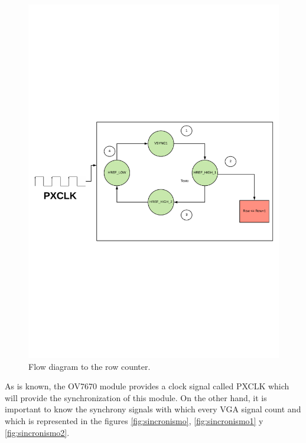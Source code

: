 	\begin{figure}[H]
		\center
		\includegraphics[trim = 0mm 8cm 0mm 8cm, clip,scale=0.5]{imagenes/Cuadricoptero_vision/row_counter.pdf}
		\caption{Flow diagram to the row counter.}
		\label{row_counter}
	\end{figure}
	
	As is known, the OV7670 module provides a clock signal called PXCLK which will provide the synchronization of this module. On the other hand, it is important to know the synchrony signals with which every VGA signal count and which is represented in the figures \ref{fig:sincronismo}, \ref{fig:sincronismo1} y \ref{fig:sincronismo2}.
	
